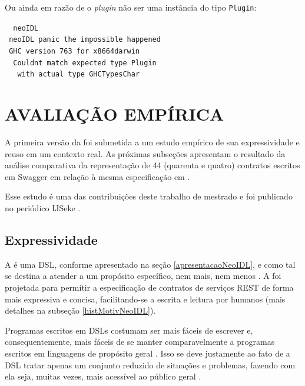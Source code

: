 Ou ainda em razão de o \textit{plugin} não ser uma instância do tipo
\texttt{Plugin}:

\begin{tabbing}\tt
~neoIDL\\
\tt ~neoIDL~panic~the~impossible~happened\\
\tt ~GHC~version~763~for~x8664darwin\\
\tt ~~Couldnt~match~expected~type~Plugin\\
\tt ~~~with~actual~type~GHCTypesChar
\end{tabbing}


\section{AVALIAÇÃO EMPÍRICA}
\vspace{-6mm}

A primeira versão da \neoidl{} foi submetida a um estudo empírico de sua expressividade 
e reuso em um contexto real. As próximas subseções apresentam 
o resultado da análise comparativa da representação de 44 (quarenta e quatro)
contratos escritos em Swagger em relação à mesma especificação em \neoidl{}.

Esse estudo é uma das contribuições deste trabalho de mestrado e foi publicado
no periódico IJSeke \cite{lima2015neoidl}.

\subsection{Expressividade}
\label{estudoExpressividadeNeoIDL}
\vspace{-6mm}

A \neoidl{} é uma DSL, conforme apresentado na seção \ref{apresentacaoNeoIDL},
e como tal se destina a atender a um propósito específico, nem mais, nem menos
\cite{hudak1998modular}. A \neoidl{} foi projetada para permitir a
especificação de contratos de serviços REST de forma mais expressiva e concisa,
facilitando-se a escrita e leitura por humanos (mais detalhes na subseção
\ref{histMotivNeoIDL}).

Programas escritos em DSLs costumam ser mais fáceis de escrever e,
consequentemente, mais fáceis de se manter comparavelmente a programas escritos
em linguagens de propósito geral \cite{hudak1998modular}. Isso se deve
justamente ao fato de a DSL tratar apenas um conjunto reduzido de situações e
problemas, fazendo com ela seja, muitas vezes, mais acessível ao público geral
\cite{taha2008domain}.

